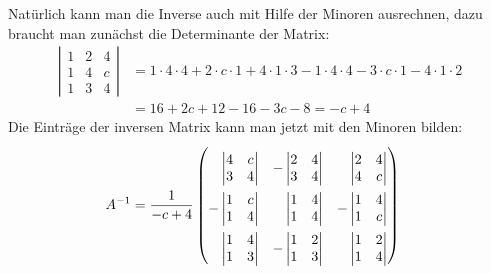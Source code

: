 \begin{loesung}
\begin{teilaufgaben}
Natürlich kann man die Inverse auch mit Hilfe der Minoren ausrechnen,
dazu braucht man zunächst die Determinante der Matrix:
\begin{align*}
\left|\begin{matrix}
1&2&4\\
1&4&c\\
1&3&4
\end{matrix}\right|
&=1\cdot 4\cdot 4+2\cdot c\cdot 1+4\cdot 1\cdot 3
-1\cdot 4\cdot 4-3\cdot c\cdot 1-4\cdot 1\cdot 2
\\
&=
16+2c+12-16-3c-8
=
-c+4
\end{align*}
Die Einträge der inversen Matrix kann man jetzt mit den Minoren bilden:
\begin{align*}
A^{-1}
&=
\def\arraystretch{2.3}
\frac1{-c+4}\begin{pmatrix}
\def\arraystretch{1}
\phantom{-}\left|\begin{matrix}4&c\\3&4\end{matrix}\right|
	&\def\arraystretch{1}
	-\left|\begin{matrix}2&4\\3&4\end{matrix}\right|
		&\def\arraystretch{1}
		\phantom{-}\left|\begin{matrix}2&4\\4&c\end{matrix}\right|
\\
\def\arraystretch{1}
-\left|\begin{matrix}1&c\\1&4\end{matrix}\right|
	&\def\arraystretch{1}
	\phantom{-}\left|\begin{matrix}1&4\\1&4\end{matrix}\right|
		&\def\arraystretch{1}
		-\left|\begin{matrix}1&4\\1&c\end{matrix}\right|
\\
\def\arraystretch{1}
\phantom{-}\left|\begin{matrix}1&4\\1&3\end{matrix}\right|
	&\def\arraystretch{1}
	-\left|\begin{matrix}1&2\\1&3\end{matrix}\right|
		&\def\arraystretch{1}
		\phantom{-}\left|\begin{matrix}1&2\\1&4\end{matrix}\right|

\end{pmatrix}
\end{align*}
\end{teilaufgaben}
\end{loesung}
